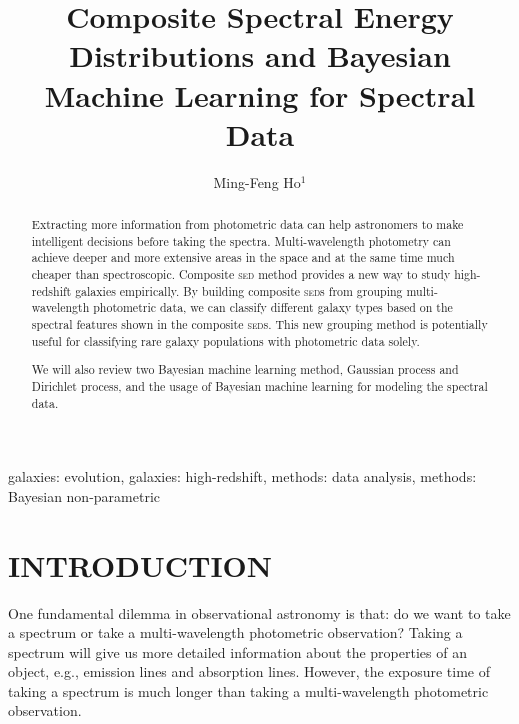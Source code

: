 \documentclass{ar-1col}
\begin{document}

\title{Composite Spectral Energy Distributions and Bayesian Machine Learning for Spectral Data}

\author{Ming-Feng Ho$^1$
}

\begin{abstract}
Extracting more information from photometric data can help astronomers to make intelligent decisions before taking the spectra.
Multi-wavelength photometry can achieve deeper and more extensive areas in the space and at the same time much cheaper than spectroscopic.
Composite \textsc{sed} method provides a new way to study high-redshift galaxies empirically.
By building composite \textsc{sed}s from grouping multi-wavelength photometric data, we can classify different galaxy types based on the spectral features shown in the composite \textsc{sed}s.
This new grouping method is potentially useful for classifying rare galaxy populations with photometric data solely.

We will also review two Bayesian machine learning method, Gaussian process and Dirichlet process, and the usage of Bayesian machine learning for modeling the spectral data.
\end{abstract}

\begin{keywords}
galaxies: evolution, galaxies: high-redshift, methods: data analysis, methods: Bayesian non-parametric
\end{keywords}
\maketitle

\tableofcontents


\section{INTRODUCTION}
One fundamental dilemma in observational astronomy is that: do we want to take a spectrum or take a multi-wavelength photometric observation? 
Taking a spectrum will give us more detailed information about the properties of an object, e.g., emission lines and absorption lines. 
However, the exposure time of taking a spectrum is much longer than taking a multi-wavelength photometric observation. 
\end{document}
